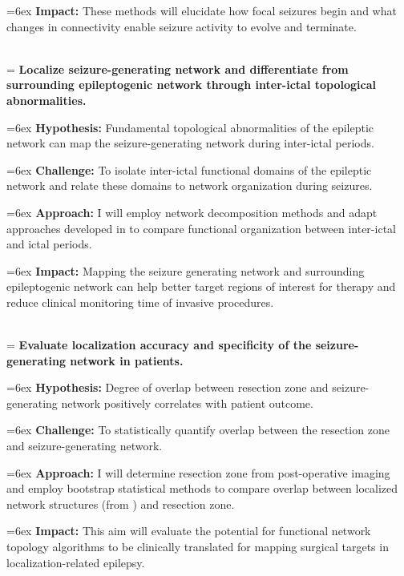 \hangindent=6ex
\textbf{Impact:} These methods will elucidate how focal seizures begin and what changes in connectivity enable seizure activity to evolve and terminate.

~\\
\hangindent=\parindent
{}
\noindent
{} \textbf{Localize seizure-generating network and differentiate from surrounding epileptogenic network through inter-ictal topological abnormalities.}

\hangindent=6ex
\textbf{Hypothesis:} Fundamental topological abnormalities of the epileptic network can map the seizure-generating network during inter-ictal periods.

\hangindent=6ex
\textbf{Challenge:} To isolate inter-ictal functional domains of the epileptic network and relate these domains to network organization during seizures.

\hangindent=6ex
\textbf{Approach:} I will employ network decomposition methods and adapt approaches developed in  to compare functional organization between inter-ictal and ictal periods.

\hangindent=6ex
\textbf{Impact:} Mapping the seizure generating network and surrounding epileptogenic network can help better target regions of interest for therapy and reduce clinical monitoring time of invasive procedures.

~\\
\hangindent=\parindent
{}
\noindent
{} \textbf{Evaluate localization accuracy and specificity of the seizure-generating network in patients.}

\hangindent=6ex
\textbf{Hypothesis:} Degree of overlap between resection zone and seizure-generating network positively correlates with patient outcome.

\hangindent=6ex
\textbf{Challenge:} To statistically quantify overlap between the resection zone and seizure-generating network.

\hangindent=6ex
\textbf{Approach:} I will determine resection zone from post-operative imaging and employ bootstrap statistical methods to compare overlap between localized network structures (from ) and resection zone.

\hangindent=6ex
\textbf{Impact:} This aim will evaluate the potential for functional network topology algorithms to be clinically translated for mapping surgical targets in localization-related epilepsy.
